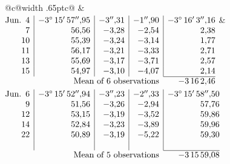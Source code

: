 \noindent\begin{tabular}{@{}c@{\hspace{.4em}\vrule width .65pt\hspace{.4em}}c@{}}
 &
 \\[.18ex]
\(\begin{array}[t]{@{}r|r|r|r|r@{}}
\text{Jun.}\enspace 4 & -3^\circ\,15'\,57''{,}95 & -3''{,}31 & -1''{,}90 & -3^\circ\,16'\,3''{,}16\\
7 & 56{,}56 & -3{,}28 & -2{,}54 & 2{,}38\\
10 & 55{,}39 & -3{,}24 & -3{,}14 & 1{,}77\\
11 & 56{,}17 & -3{,}21 & -3{,}33 & 2{,}71\\
13 & 55{,}69 & -3{,}17 & -3{,}71 & 2{,}57\\
15 & 54{,}97 & -3{,}10 & -4{,}07 & 2{,}14\\
\cline{5-5}
\multicolumn{4}{r}{\text{Mean of 6 observations}} & -3\,16\,2{,}46
\end{array}\)
&
\(\begin{array}[t]{@{}r|r|r|r|r@{}}
\text{Jun.}\enspace 6 & -3^\circ\,15'\,52''{,}94 & -3''{,}23 & -2''{,}33 & -3^\circ\,15'\,58''{,}50\\
9 & 51{,}56 & -3{,}26 & -2{,}94 & 57{,}76\\
12 & 53{,}15 & -3{,}19 & -3{,}52 & 59{,}86\\
14 & 52{,}84 & -3{,}23 & -3{,}89 & 59{,}96\\
22 & 50{,}89 & -3{,}19 & -5{,}22 & 59{,}30\\
 & & & & \\
\cline{5-5}
\multicolumn{4}{r}{\text{Mean of 5 observations}} & -3\,15\,59{,}08
\end{array}\)
\end{tabular}\par\medskip
{}
